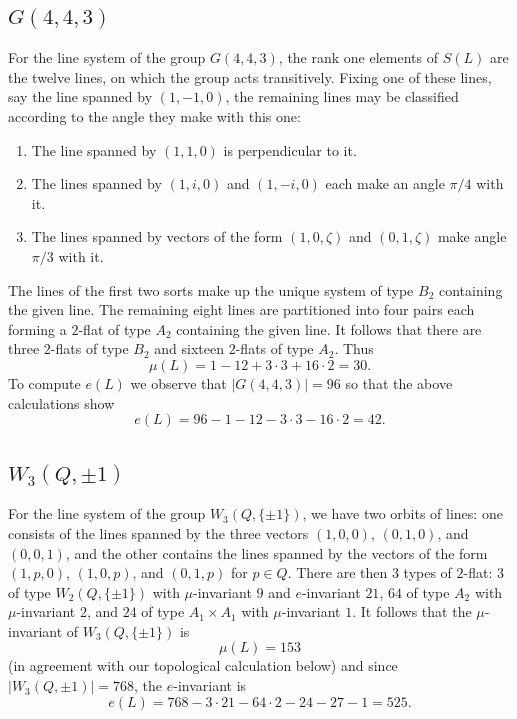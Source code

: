 \documentclass[11pt, reqno]{amsart}
\numberwithin{equation}{section}
\theoremstyle{definition}
\theoremstyle{plain}
\begin{document}
\subsection{$G(4,4,3)$} For the line system of the group $G(4,4,3)$, the rank one elements of $S(L)$ are the twelve lines, on which the group acts transitively. Fixing one of these lines, say the line spanned by $(1,-1,0)$, the remaining lines may be classified according to the angle they make with this one:
\begin{enumerate}
\item[(a)] The line spanned by $(1,1,0)$ is perpendicular to it.
\item[(b)] The lines spanned by $(1,i,0)$ and $(1,-i,0)$ each make an angle $\pi/4$ with it.
\item[(c)] The lines spanned by vectors of the form $(1,0,\zeta)$ and $(0,1,\zeta)$ make angle $\pi/3$ with it.
\end{enumerate} The lines of the first two sorts make up the unique system of type $B_2$ containing the given line. The remaining eight lines are partitioned into four pairs each forming a $2$-flat of type $A_2$ containing the given line. It follows that there are three $2$-flats of type $B_2$ and sixteen $2$-flats of type $A_2$. Thus
$$\mu(L)=1-12+3\cdot 3+16\cdot 2=30.$$ To compute $e(L)$ we observe that $|G(4,4,3)|=96$ so that the above calculations show
$$e(L)=96-1-12-3 \cdot 3-16\cdot 2=42.$$

\subsection{$W_3(Q,\pm 1)$} For the line system of the group $W_3(Q,\{\pm 1\})$, we have two orbits of lines: one consists of the lines spanned by the three vectors $(1,0,0)$, $(0,1,0)$, and $(0,0,1)$, and the other contains the lines spanned by the vectors of the form $(1,p,0)$, $(1,0,p)$, and $(0,1,p)$ for $p \in Q$. There are then $3$ types of $2$-flat: $3$ of type $W_2(Q,\{ \pm 1\})$ with $\mu$-invariant $9$ and $e$-invariant $21$, $64$ of type $A_2$ with $\mu$-invariant $2$, and $24$ of type $A_1 \times A_1$ with $\mu$-invariant $1$. It follows that the $\mu$-invariant of $W_3(Q,\{\pm 1\})$ is $$\mu(L)=153$$ (in agreement with our topological calculation below) and since $|W_3(Q,\pm 1)|=768$, the $e$-invariant is
$$e(L)=768-3\cdot 21-64\cdot 2-24-27-1=525.$$
\end{document}
